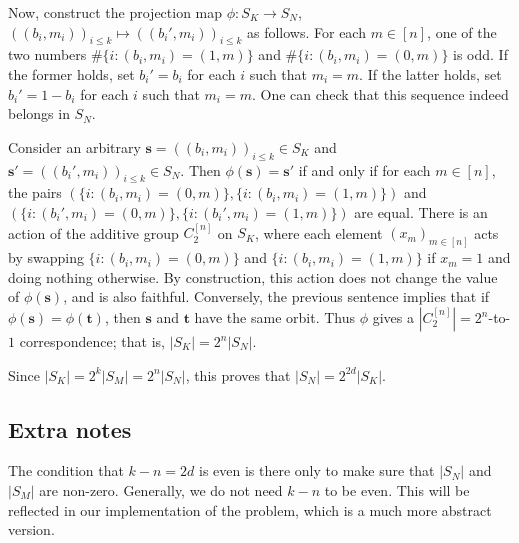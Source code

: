 Now, construct the projection map $\phi : S_K \to S_N$, $((b_i, m_i))_{i \leq k} \mapsto ((b_i', m_i))_{i \leq k}$ as follows.
For each $m \in [n]$, one of the two numbers $\#\{i : (b_i, m_i) = (1, m)\}$ and $\#\{i : (b_i, m_i) = (0, m)\}$ is odd.
If the former holds, set $b_i' = b_i$ for each $i$ such that $m_i = m$.
If the latter holds, set $b_i' = 1 - b_i$ for each $i$ such that $m_i = m$.
One can check that this sequence indeed belongs in $S_N$.

Consider an arbitrary $\mathbf{s} = ((b_i, m_i))_{i \leq k} \in S_K$ and $\mathbf{s}' = ((b_i', m_i))_{i \leq k} \in S_N$.
Then $\phi(\mathbf{s}) = \mathbf{s}'$ if and only if for each $m \in [n]$, the pairs $(\{i : (b_i, m_i) = (0, m)\}, \{i : (b_i, m_i) = (1, m)\})$ and $(\{i : (b_i', m_i) = (0, m)\}, \{i : (b_i', m_i) = (1, m)\})$ are equal.
There is an action of the additive group $C_2^[n]$ on $S_K$, where each element $(x_m)_{m \in [n]}$ acts by swapping $\{i : (b_i, m_i) = (0, m)\}$ and $\{i : (b_i, m_i) = (1, m)\}$ if $x_m = 1$ and doing nothing otherwise.
By construction, this action does not change the value of $\phi(\mathbf{s})$, and is also faithful.
Conversely, the previous sentence implies that if $\phi(\mathbf{s}) = \phi(\mathbf{t})$, then $\mathbf{s}$ and $\mathbf{t}$ have the same orbit.
Thus $\phi$ gives a $|C_2^[n]| = 2^n$-to-$1$ correspondence; that is, $|S_K| = 2^n |S_N|$.

Since $|S_K| = 2^k |S_M| = 2^n |S_N|$, this proves that $|S_N| = 2^{2d} |S_K|$.



\subsection*{Extra notes}

The condition that $k - n = 2d$ is even is there only to make sure that $|S_N|$ and $|S_M|$ are non-zero.
Generally, we do not need $k - n$ to be even.
This will be reflected in our implementation of the problem, which is a much more abstract version.
